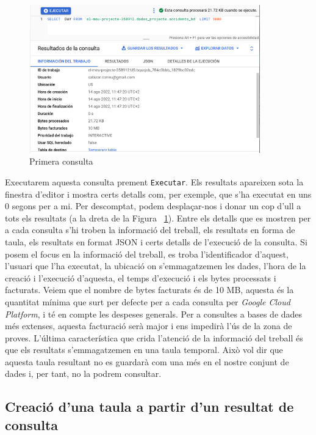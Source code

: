 \documentclass[12pt,longbibliography]{article}
\theoremstyle{definition}
\theoremstyle{remark}
\begin{document}
\vspace{2mm}
\begin{figure}[h!]
\begin{center}
\includegraphics[width=10cm]{bq19}
\end{center}
\caption{Primera consulta}
\label{fig:bq19}
\end{figure}
\vspace{2mm}

Executarem aquesta consulta prement \verb|Executar|. Els resultats apareixen sota la finestra d'editor i mostra certs detalls com, per exemple, que s'ha executat en uns 0 segons per a mi. Per descomptat, podem desplaçar-nos i donar un cop d'ull a tots els resultats (a la dreta de la Figura ~\ref{fig:bq19}). Entre els detalls que es mostren per a cada consulta s'hi troben la informació del treball, els resultats en forma de taula, els resultats en format JSON i certs detalls de l'execució de la consulta. Si posem el focus en la informació del treball, es troba l'identificador d'aquest, l'usuari que l'ha executat, la ubicació on s'emmagatzemen les dades, l'hora de la creació i l'execució d'aquesta, el temps d'execució i els bytes processats i facturats. Veiem que el nombre de bytes facturats és de 10 MB, aquesta és la quantitat mínima que surt per defecte per a cada consulta per \textit{Google Cloud Platform}, i té en compte les despeses generals. Per a consultes a bases de dades més extenses, aquesta facturació serà major i ens impedirà l'ús de la zona de proves. L'última característica que crida l'atenció de la informació del treball és que els resultats s'emmagatzemen en una taula temporal. Això vol dir que aquesta taula resultant no es guardarà com una més en el nostre conjunt de dades i, per tant, no la podrem consultar.

\vspace{2mm}

\subsection{Creació d'una taula a partir d'un resultat de consulta}
\end{document}
